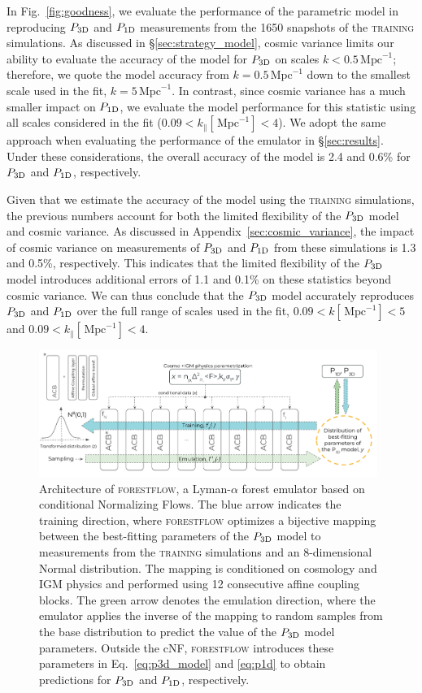 \documentclass[longauth]{aa}
\newcommand{\lyaf}{Lyman-$\alpha$ forest\xspace}
\newcommand{\poned}{\ensuremath{P_{\rm 1D}}\xspace}
\newcommand{\pthreed}{\ensuremath{P_{\rm 3D}}\xspace}
\newcommand{\forestflow}{\textsc{forestflow}\xspace}
\newcommand{\lacehc}{\textsc{training}\xspace}
\newcommand{\iMpc}{\ensuremath{\,\mathrm{Mpc}^{-1}}}
\begin{document}
In Fig.~\ref{fig:goodness}, we evaluate the performance of the parametric model in reproducing \pthreed and \poned measurements from the 1650 snapshots of the \lacehc simulations. As discussed in \S\ref{sec:strategy_model}, cosmic variance limits our ability to evaluate the accuracy of the model for \pthreed on scales $k<0.5\iMpc$; therefore, we quote the model accuracy from $k=0.5\iMpc$ down to the smallest scale used in the fit, $k=5\iMpc$. In contrast, since cosmic variance has a much smaller impact on \poned, we evaluate the model performance for this statistic using all scales considered in the fit ($0.09<k_\parallel[\iMpc]<4$). We adopt the same approach when evaluating the performance of the emulator in \S\ref{sec:results}. Under these considerations, the overall accuracy of the model is 2.4 and 0.6\% for \pthreed and \poned, respectively. 

Given that we estimate the accuracy of the model using the \lacehc simulations, the previous numbers account for both the limited flexibility of the \pthreed model and cosmic variance. As discussed in Appendix~\ref{sec:cosmic_variance}, the impact of cosmic variance on measurements of \pthreed and \poned from these simulations is 1.3 and 0.5\%, respectively. This indicates that the limited flexibility of the \pthreed model introduces additional errors of 1.1 and 0.1\% on these statistics beyond cosmic variance. We can thus conclude that the \pthreed model accurately reproduces \pthreed and \poned over the full range of scales used in the fit, $0.09<k[\iMpc]<5$ and $0.09<k_\parallel[\iMpc]<4$.


\begin{figure}
    \includegraphics[width= 0.98\textwidth]{figures/network_architecture.png} 
    \centering
    \caption{Architecture of \forestflow, a \lyaf emulator based on conditional Normalizing Flows. The blue arrow indicates the training direction, where \forestflow optimizes a bijective mapping between the best-fitting parameters of the \pthreed model to measurements from the \lacehc simulations and an 8-dimensional Normal distribution. The mapping is conditioned on cosmology and IGM physics and performed using 12 consecutive affine coupling blocks. The green arrow denotes the emulation direction, where the emulator applies the inverse of the mapping to random samples from the base distribution to predict the value of the \pthreed model parameters. Outside the cNF, \forestflow introduces these parameters in Eq.~\ref{eq:p3d_model} and \ref{eq:p1d} to obtain predictions for \pthreed and \poned, respectively.}
    \label{fig:net_architecture}
 \end{figure}
\end{document}

